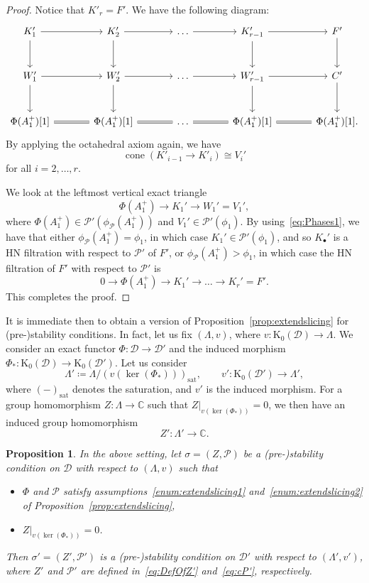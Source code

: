 \documentclass[11pt, reqno]{amsart}
\numberwithin{equation}{section}
\theoremstyle{plain}
\newtheorem{proposition}[theorem]{Proposition}
\theoremstyle{remark}
\theoremstyle{definition}
\theoremstyle{italicsname}
\DeclareMathOperator{\cone}{cone}
\newcommand{\cD}{\mathscr{D}}
\newcommand{\cP}{\mathscr{P}}
\newcommand{\rK}{\mathrm{K}}
\def\CC{\ensuremath{\mathbb{C}}}
\begin{document}
\begin{proof}
Notice that $K'_r=F'$.
We have the following diagram:
\[
\begin{tikzcd}[column sep=large,row sep=large]
K_1' \arrow[r]\arrow[d]
    & K'_2 \arrow[r]\arrow[d]
    & \dots \arrow[r]
    & K'_{r-1} \arrow[r]\arrow[d]
    & F'\arrow[d]
\\
W_1' \arrow[r]\arrow[d]
    & W_2' \arrow[r]\arrow[d]
    & \dots \arrow[r]
    & W_{r-1}' \arrow[r]\arrow[d]
    & C'\arrow[d]
\\
\Phi(A_1^+)[1]
    & \Phi(A_1^+)[1] \arrow[l,equal]
    & \dots \arrow[l,equal]
    & \Phi(A_1^+)[1] \arrow[l,equal]
    & \Phi(A_1^+)[1]. \arrow[l,equal]
\end{tikzcd}
\]
By applying the octahedral axiom again, we have
\[
\cone(K'_{i-1}\to K'_i)\cong V_i'
\]
for all $i=2,\dots,r$.

We look at the leftmost vertical exact triangle
\[
\Phi(A_1^+)\longrightarrow K_1'\longrightarrow W_1'=V_1',
\]
where $\Phi(A_1^+)\in\cP'(\phi_\cP(A_1^+))$ and $V_1'\in\cP'(\phi_1)$.
By using~\eqref{eq:Phases1}, we have that either $\phi_\cP(A_1^+)=\phi_1$, in which case 
$K_1'\in\cP'(\phi_1)$, and so $K_\bullet'$ is a HN filtration with respect to $\cP'$ of $F'$, or $\phi_\cP(A_1^+)>\phi_1$, in which case the HN filtration of $F'$ with respect to $\cP'$ is
\[
0\longrightarrow\Phi(A_1^+)\longrightarrow K_1'\longrightarrow\dots\longrightarrow K_{r}'=F'.
\]
This completes the proof.
\end{proof}

It is immediate then to obtain a version of Proposition~\ref{prop:extendslicing} for (pre-)stability conditions.
In fact, let us fix $(\Lambda,v)$, where $v\colon\rK_0(\cD)\to\Lambda$.
We consider an exact functor $\Phi\colon\cD\to\cD'$ and the induced morphism
$\Phi_*\colon\rK_0(\cD)\to\rK_0(\cD')$.
Let us consider
\[
\Lambda'\coloneqq \Lambda/(v(\ker(\Phi_*)))_{\mathrm{sat}},\qquad v'\colon\rK_0(\cD')\longrightarrow\Lambda',
\]
where $(-)_{\mathrm{sat}}$ denotes the saturation, and $v'$ is the induced morphism.
For a group homomorphism $Z\colon\Lambda\to\CC$ such that $Z|_{v(\ker(\Phi_*))}=0$, we then have an induced group homomorphism
\begin{equation}\label{eq:DefOfZ'}
Z'\colon\Lambda'\longrightarrow\CC.
\end{equation}

\begin{proposition}\label{prop:extendstabcond}
In the above setting, let $\sigma=(Z,\cP)$ be a (pre-)stability condition on $\cD$ with respect to $(\Lambda,v)$ such that
\begin{itemize}
    \item $\Phi$ and $\cP$ satisfy assumptions~\ref{enum:extendslicing1} and~\ref{enum:extendslicing2} of Proposition~\ref{prop:extendslicing},
    \item $Z|_{v(\ker(\Phi_*))}=0$.
\end{itemize}
Then $\sigma'=(Z',\cP')$ is a (pre-)stability condition on $\cD'$ with respect to $(\Lambda',v')$, where $Z'$ and $\cP'$ are defined in~\eqref{eq:DefOfZ'} and~\eqref{eq:cP'}, respectively. 
\end{proposition}
\end{document}

